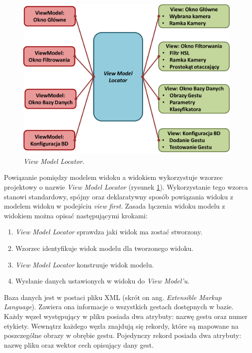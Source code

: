 \begin{figure}[h!]
	\centering
	\includegraphics[width=14cm]{ViewModelLocator}
	\centering
	\caption{\textit{View Model Locator}.}
	\label{im: ViewModelLocator}
\end{figure}

Powiązanie pomiędzy modelem widoku a widokiem wykorzystuje wzorzec projektowy o nazwie \textit{View Model Locator} (rysunek \ref{im: ViewModelLocator}). Wykorzystanie tego wzorca stanowi standardowy, spójny oraz deklaratywny sposób powiązania widoku z modelem widoku  w podejściu \textit{view first}. Zasada łączenia widoku modelu z widokiem można opisać następującymi krokami:
\begin{enumerate}
	\item \textit{View Model Locator} sprawdza jaki widok ma zostać stworzony.
	\item Wzorzec identyfikuje widok modelu dla  tworzonego widoku.
	\item \textit{View Model Locator} konstruuje widok modelu.
	\item Wysłanie danych ustawionych w widoku do \textit{View Model'u}.
\end{enumerate}

Baza danych jest w postaci pliku XML (skrót on ang. \textit{Extensible Markup Language}). Zawiera ona informacje o wszystkich gestach dostępnych w bazie. Każdy węzeł występujący w pliku posiada dwa atrybuty: nazwę gestu oraz numer etykiety. Wewnątrz każdego węzła znajdują się rekordy, które są mapowane na  poszczególne obrazy w obrębie gestu. Pojedynczy rekord posiada dwa atrybuty: nazwę pliku oraz wektor cech opisujący dany gest.

